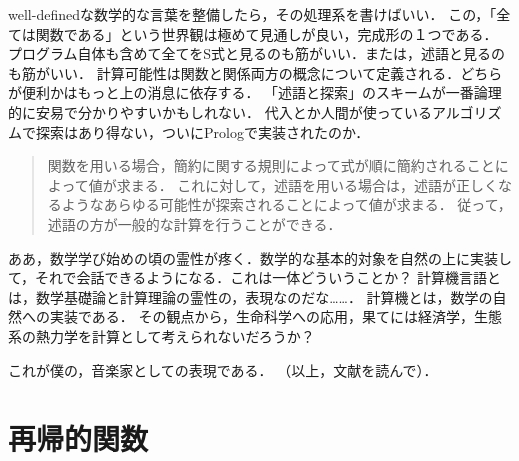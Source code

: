 \documentclass[uplatex, dvipdfmx]{jsreport}
\begin{document}
\begin{screen}
well-definedな数学的な言葉を整備したら，その処理系を書けばいい．
この，「全ては関数である」という世界観は極めて見通しが良い，完成形の１つである．
プログラム自体も含めて全てをS式と見るのも筋がいい．または，述語と見るのも筋がいい．
計算可能性は関数と関係両方の概念について定義される．どちらが便利かはもっと上の消息に依存する．
「述語と探索」のスキームが一番論理的に安易で分かりやすいかもしれない．
代入とか人間が使っているアルゴリズムで探索はあり得ない，ついにPrologで実装されたのか．
\begin{quotation}
    関数を用いる場合，簡約に関する規則によって式が順に簡約されることによって値が求まる．
    これに対して，述語を用いる場合は，述語が正しくなるようなあらゆる可能性が探索されることによって値が求まる．
    従って，述語の方が一般的な計算を行うことができる\cite{関数プログラミング}．
\end{quotation}
ああ，数学学び始めの頃の霊性が疼く．数学的な基本的対象を自然の上に実装して，それで会話できるようになる．これは一体どういうことか？
計算機言語とは，数学基礎論と計算理論の霊性の，表現なのだな……．
計算機とは，数学の自然への実装である．
その観点から，生命科学への応用，果てには経済学，生態系の熱力学を計算として考えられないだろうか？

これが僕の，音楽家としての表現である．
（以上，文献\cite{関数プログラミング}を読んで）．
\end{screen}

\section{再帰的関数}
\end{document}
